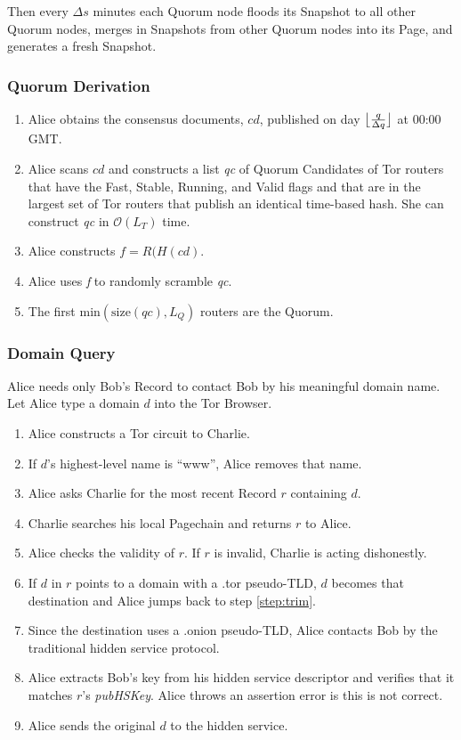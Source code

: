 \documentclass{sig-alternate}
\DeclarePairedDelimiter{\floor}{\lfloor}{\rfloor}
\begin{document}
Then every $ \Delta s $ minutes each Quorum node floods its Snapshot to all other Quorum nodes, merges in Snapshots from other Quorum nodes into its Page, and generates a fresh Snapshot.

\subsubsection{Quorum Derivation} %

\begin{enumerate}
	\item Alice obtains the consensus documents, $ cd $, published on day $ \floor[\big]{\frac{q}{\Delta q}} $ at 00:00 GMT.
	\item Alice scans $ cd $ and constructs a list \emph{qc} of Quorum Candidates of Tor routers that have the Fast, Stable, Running, and Valid flags and that are in the largest set of Tor routers that publish an identical time-based hash. She can construct \emph{qc} in $ \mathcal{O}(L_{T}) $ time.
	\item Alice constructs $ f = \mathit{R}(H(\mathit{cd}) $.
	\item Alice uses \emph{f} to randomly scramble \emph{qc}.
	\item The first $ \mathrm{min}(\mathrm{size}(\mathit{qc}), L_{Q}) $ routers are the Quorum.
\end{enumerate}

\newpage

\subsubsection{Domain Query} %

Alice needs only Bob's Record to contact Bob by his meaningful domain name. Let Alice type a domain $ d $ into the Tor Browser.

\begin{enumerate}[noitemsep]
	\item Alice constructs a Tor circuit to Charlie.
	\item \label{step:trim} If $ d $'s highest-level name is ``www'', Alice removes that name.
	\item \label{step:level} Alice asks Charlie for the most recent Record $ r $ containing $ d $.
	\item Charlie searches his local Pagechain and returns $ r $ to Alice.
	\item Alice checks the validity of $ r $. If $ r $ is invalid, Charlie is acting dishonestly.
	\item If $ d $ in $ r $ points to a domain with a .tor pseudo-TLD, $ d $ becomes that destination and Alice jumps back to step \ref{step:trim}.
	\item Since the destination uses a .onion pseudo-TLD, Alice contacts Bob by the traditional hidden service protocol.
	\item Alice extracts Bob's key from his hidden service descriptor and verifies that it matches $ r $'s \emph{pubHSKey}. Alice throws an assertion error is this is not correct.
	\item Alice sends the original $ d $ to the hidden service.
\end{enumerate}
\end{document}
